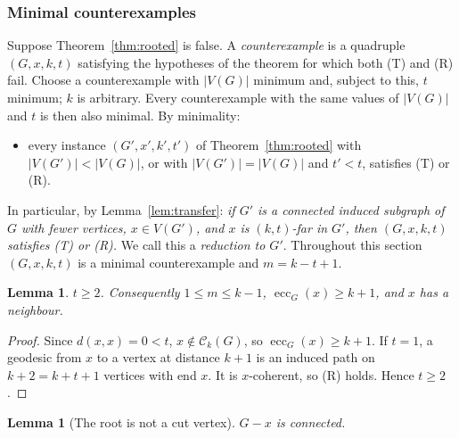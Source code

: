 \documentclass[11pt,a4paper]{article}
\newtheorem{lemma}[theorem]{Lemma}
\theoremstyle{remark}
\newcommand{\ecc}{\operatorname{ecc}}
\newcommand{\C}{\mathcal C}
\begin{document}
\subsubsection{Minimal counterexamples}

Suppose Theorem~\ref{thm:rooted} is false. A \emph{counterexample} is a quadruple $(G,x,k,t)$ satisfying the hypotheses of the theorem for which both (T) and (R) fail. Choose a counterexample with $|V(G)|$ minimum and, subject to this, $t$ minimum; $k$ is arbitrary. Every counterexample with the same values of $|V(G)|$ and $t$ is then also minimal. By minimality:
\begin{itemize}
\item[$(\ast)$] every instance $(G',x',k',t')$ of Theorem~\ref{thm:rooted} with $|V(G')|<|V(G)|$, or with $|V(G')|=|V(G)|$ and $t'<t$, satisfies (T) or (R).
\end{itemize}
In particular, by Lemma~\ref{lem:transfer}: \emph{if $G'$ is a connected induced subgraph of $G$ with fewer vertices, $x\in V(G')$, and $x$ is $(k,t)$-far in $G'$, then $(G,x,k,t)$ satisfies (T) or (R).} We call this a \emph{reduction to $G'$}. Throughout this section $(G,x,k,t)$ is a minimal counterexample and $m=k-t+1$.

\begin{lemma}\label{lem:t2}
$t\ge2$. Consequently $1\le m\le k-1$, $\ecc_G(x)\ge k+1$, and $x$ has a neighbour.
\end{lemma}

\begin{proof}
Since $d(x,x)=0<t$, $x\notin\C_k(G)$, so $\ecc_G(x)\ge k+1$. If $t=1$, a geodesic from $x$ to a vertex at distance $k+1$ is an induced path on $k+2=k+t+1$ vertices with end $x$. It is $x$-coherent, so (R) holds. Hence $t\ge2$.
\end{proof}

\begin{lemma}[The root is not a cut vertex]\label{lem:noncut}
$G-x$ is connected.
\end{lemma}
\end{document}
